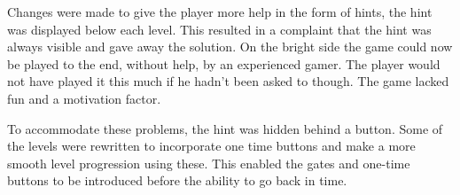 Changes were made to give the player more help in the form of hints,
the hint was displayed below each level. This resulted in a complaint
that the hint was always visible and gave away the solution. On the
bright side the game could now be played to the end, without help, by an
experienced gamer. The player would not have played it this much if he
hadn't been asked to though. The game lacked fun and a motivation
factor.

To accommodate these problems, the hint was hidden behind a button.
Some of the levels were rewritten to incorporate one time buttons and make
a more smooth level progression using these. This enabled the gates
and one-time buttons to be introduced before the ability to go back in
time.
